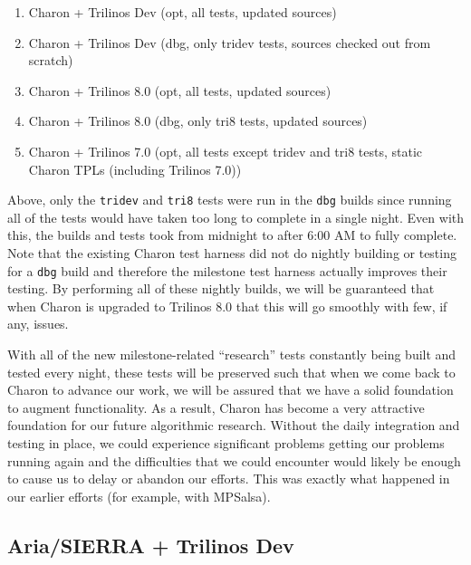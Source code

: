 \documentclass[pdf,ps2pdf,11pt]{SANDreport}
\begin{document}
\begin{enumerate}
%
{}\item Charon + Trilinos Dev (opt, all tests, updated sources)
%
{}\item Charon + Trilinos Dev (dbg, only tridev tests, sources checked out
from scratch)
%
{}\item Charon + Trilinos 8.0 (opt, all tests, updated sources)
%
{}\item Charon + Trilinos 8.0 (dbg, only tri8 tests, updated sources)
%
{}\item Charon + Trilinos 7.0 (opt, all tests except tridev and tri8 tests,
static Charon TPLs (including Trilinos 7.0))
%
\end{enumerate}

Above, only the {}\texttt{tridev} and {}\texttt{tri8} tests were run in the
{}\texttt{dbg} builds since running all of the tests would have taken too long
to complete in a single night.  Even with this, the builds and tests took from
midnight to after 6:00 AM to fully complete.  Note that the existing Charon
test harness did not do nightly building or testing for a {}\texttt{dbg} build
and therefore the milestone test harness actually improves their testing.  By
performing all of these nightly builds, we will be guaranteed that when Charon
is upgraded to Trilinos 8.0 that this will go smoothly with few, if any,
issues.

With all of the new milestone-related ``research'' tests constantly being
built and tested every night, these tests will be preserved such that when we
come back to Charon to advance our work, we will be assured that we have a
solid foundation to augment functionality.  As a result, Charon has become a
very attractive foundation for our future algorithmic research.  Without the
daily integration and testing in place, we could experience significant
problems getting our problems running again and the difficulties that we could
encounter would likely be enough to cause us to delay or abandon our efforts.
This was exactly what happened in our earlier efforts (for example, with
MPSalsa).


%
\subsection{Aria/SIERRA + Trilinos Dev}
%
\end{document}
